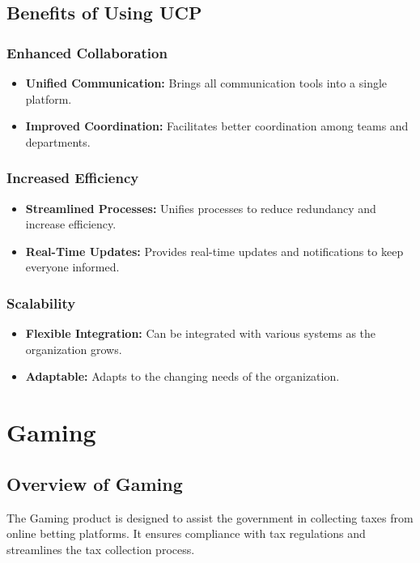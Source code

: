 \documentclass[a4paper,12pt]{report}
\begin{document}
	\subsection{Benefits of Using UCP}
	
	\subsubsection{Enhanced Collaboration}
	\begin{itemize}
		\item \textbf{Unified Communication:} Brings all communication tools into a single platform.
		\item \textbf{Improved Coordination:} Facilitates better coordination among teams and departments.
	\end{itemize}
	
	\subsubsection{Increased Efficiency}
	\begin{itemize}
		\item \textbf{Streamlined Processes:} Unifies processes to reduce redundancy and increase efficiency.
		\item \textbf{Real-Time Updates:} Provides real-time updates and notifications to keep everyone informed.
	\end{itemize}
	
	\subsubsection{Scalability}
	\begin{itemize}
		\item \textbf{Flexible Integration:} Can be integrated with various systems as the organization grows.
		\item \textbf{Adaptable:} Adapts to the changing needs of the organization.
	\end{itemize}
	
	\section{Gaming}
	
	\subsection{Overview of Gaming}
	The Gaming product is designed to assist the government in collecting taxes from online betting platforms. It ensures compliance with tax regulations and streamlines the tax collection process.
	
\end{document}
